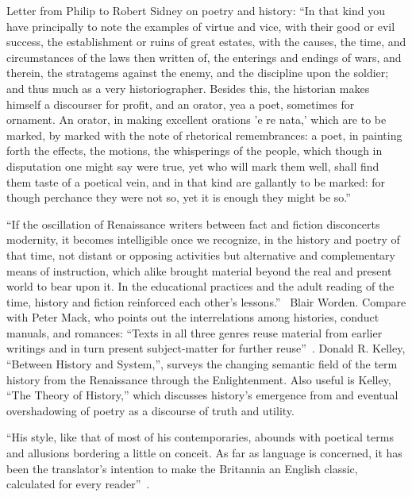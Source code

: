Letter from Philip to Robert Sidney on poetry and history: ``In that kind you have principally to note the examples of virtue and vice, with their good or evil success, the establishment or ruins of great estates, with the causes, the time, and circumstances of the laws then written of, the enterings and endings of wars, and therein, the stratagems against the enemy, and the discipline upon the soldier; and thus much as a very historiographer. Besides this, the historian makes himself a discourser for profit, and an orator, yea a poet, sometimes for ornament. An orator, in making excellent orations 'e re nata,' which are to be marked, by marked with the note of rhetorical remembrances: a poet, in painting forth the effects, the motions, the whisperings of the people, which though in disputation one might say were true, yet who will mark them well, shall find them taste of a poetical vein, and in that kind are gallantly to be marked: for though perchance they were not so, yet it is enough they might be so.''~\cite[220--221]{sidney_correspondence_1912}

``If the oscillation of Renaissance writers between fact and fiction disconcerts modernity, it becomes intelligible once we recognize, in the history and poetry of that time, not distant or opposing activities but alternative and complementary means of instruction, which alike brought material beyond the real and present world to bear upon it. In the educational practices and the adult reading of the time, history and fiction reinforced each other's lessons.''~\cite[77]{worden_historians_2006} Blair Worden. Compare with Peter Mack, who points out the interrelations among histories, conduct manuals, and romances: ``Texts in all three genres reuse material from earlier writings and in turn present subject-matter for further reuse''~\cite[135]{mack_elizabethan_2002}. Donald R. Kelley, ``Between History and System,''\nocite{kelley_between_2005}, surveys the changing semantic field of the term history from the Renaissance through the Enlightenment. Also useful is Kelley, ``The Theory of History,''\nocite{kelley_theory_1988} which discusses history's emergence from and eventual overshadowing of poetry as a discourse of truth and utility.

``His style, like that of most of his contemporaries, abounds with poetical terms and allusions bordering a little on conceit. As far as language is concerned, it has been the translator's intention to make the Britannia an English classic, calculated for every reader''~\cite[vii]{gough_preface_1787}.

